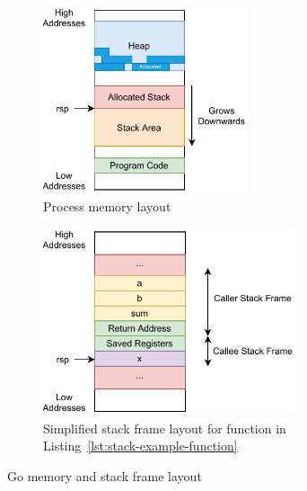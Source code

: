 \begin{figure}[htp!]
    \centering

    \begin{subfigure}[t]{0.45\textwidth}
        \centering
        \includegraphics[height=5.5cm]{assets/figures/chapter2/memory-layout.pdf}
        \caption{Process memory layout}
        \label{subfig:memory:memory-layout}
    \end{subfigure}
    \begin{subfigure}[t]{0.45\textwidth}
        \centering
        \includegraphics[height=5.5cm]{assets/figures/chapter2/stack-frame.pdf}
        \caption{Simplified stack frame layout for function in Listing~\ref{lst:stack-example-function}}
        \label{subfig:memory:stack-frame}
    \end{subfigure}

    \caption{Go memory and stack frame layout}
    \label{fig:memory-stack}
\end{figure}
